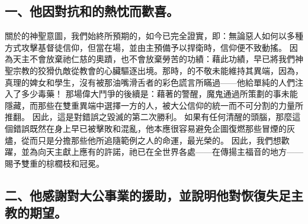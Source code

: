 
\subsection{一、他因對抗和的熱忱而歡喜。}

關於的神聖意圖，我們始終所預期的，如今已完全證實，即：無論惡人如何以多種方式攻擊基督徒信仰，但當在場，並由主預備予以捍衛時，信仰便不致動搖。\newline{} 因為天主不會放棄祂仁慈的奧蹟，也不會放棄勞苦的功績：藉此功績，早已將我們神聖宗教的狡猾仇敵從教會的心臟驅逐出境。那時，的不敬未能維持其異端，因為，真理的婢女和學生，沒有被那油嘴滑舌者的彩色謊言所瞞過——他給單純的人們注入了多少毒藥！\newline{} 那場偉大鬥爭的後續是：藉著的警醒，魔鬼通過所策劃的事未能隱藏，而那些在雙重異端中選擇一方的人，被大公信仰的統一而不可分割的力量所推翻。\newline{} 因此，這是對錯誤之毀滅的第二次勝利。\newline{} 如果有任何清醒的頭腦，那麼這個錯誤既然在身上早已被擊敗和混亂，他本應很容易避免企圖復燃那些冒煙的灰燼，從而只是分擔那些他所追隨範例之人的命運，最光榮的。\newline{} 因此，我們想歡躍，並為向天主獻上應有的許諾，祂已在全世界各處——在傳揚主福音的地方——賜予雙重的棕櫚枝和冠冕。\par


\subsection{二、他感謝對大公事業的援助，並說明他對恢復失足主教的期望。}

